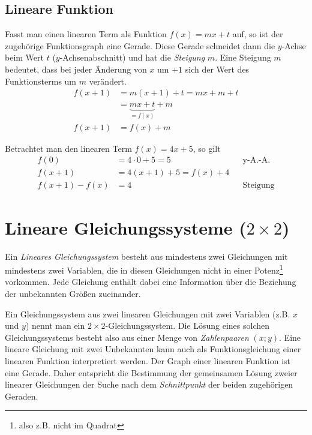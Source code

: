 \subsection{Lineare Funktion}
\begin{beme}
 Fasst man einen linearen Term als Funktion \(f(x) =mx+t\) auf, so ist der zugehörige Funktionsgraph eine Gerade. Diese Gerade schneidet dann die \(y\)-Achse beim Wert \(t\) (\(y\)-Achsenabschnitt) und hat die \emph{Steigung} \(m\). Eine Steigung \(m\) bedeutet, dass bei jeder Änderung von \(x\) um \(+1\) sich der Wert des Funktionsterms um \(m\) verändert.
 \begin{align*}
  f(x+1) &= m(x+1)+t = mx +m +t \\ &= \underbrace{mx+t}_{=f(x)} +m \\ f(x+1) &= f(x) +m
 \end{align*}

\end{beme}

\begin{bsp}
 Betrachtet man den linearen Term \(f(x) = 4x+5\), so gilt
 \begin{align*}
  f(0) &= 4\cdot 0 +5 = 5 &&  \text{y-A.-A.}\\
  f(x+1) &= 4(x+1)+5 =  f(x) +4 \\
  f(x+1)-f(x) &= 4 && \text{Steigung}
 \end{align*}

\end{bsp}


\section{Lineare Gleichungssysteme (\ensuremath{2\times 2})}
\begin{defi}
Ein \emph{Lineares Gleichungssystem} besteht aus mindestens zwei Gleichungen mit mindestens zwei Variablen, die in diesen Gleichungen nicht in einer Potenz\footnote{also z.B. nicht im Quadrat} vorkommen. Jede Gleichung enthält dabei eine Information über die Beziehung der unbekannten Größen zueinander.
\end{defi}

\begin{beme}
 Ein Gleichungssystem aus zwei linearen Gleichungen mit zwei Variablen (z.B. \(x\) und \(y\)) nennt man ein \(2\times 2\)-Gleichungssystem. Die Lösung eines solchen Gleichungssystems besteht also aus einer Menge von \emph{Zahlenpaaren} \((x;y)\). Eine lineare Gleichung mit zwei Unbekannten kann auch als Funktionsgleichung einer linearen Funktion interpretiert werden. Der Graph einer linearen Funktion ist eine Gerade. Daher entspricht die Bestimmung der gemeinsamen Lösung zweier linearer Gleichungen der Suche nach dem \emph{Schnittpunkt} der beiden zugehörigen Geraden.
\end{beme}

